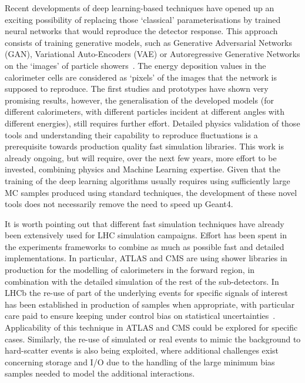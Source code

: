 Recent developments of deep
learning-based techniques have opened up an exciting possibility of
replacing those `classical' parameterisations by trained neural networks
that would reproduce the detector response. This approach consists of
training generative models, such as Generative Adversarial Networks
(GAN), Variational Auto-Encoders (VAE) or Autoregressive Generative
Networks on the `images' of particle 
showers~\cite{ML001-GAN, aishik_ghosh_2019_3599705, GAN-ATLAS}. The energy
deposition values in the calorimeter cells are considered as `pixels' of
the images that the network is supposed to reproduce. The first studies
and prototypes have shown very promising results, however, the
generalisation of the developed models (for different calorimeters, with
different particles incident at different angles with different
energies), still requires further effort. Detailed physics validation of
those tools and understanding their capability to reproduce
fluctuations is a prerequisite towards production quality fast
simulation libraries. This work is already ongoing, but will require,
over the next few years, more effort to be invested, combining
physics and Machine Learning expertise. Given that the training of the
deep learning algorithms usually requires using sufficiently large MC
samples produced using standard techniques, the development of these novel
tools does not necessarily remove the need to speed up Geant4.

It is worth pointing out that different fast simulation techniques have
already been extensively used for LHC simulation campaigns. Effort has
been spent in the experiments frameworks to combine as much as possible
fast and detailed implementations. In particular, ATLAS and CMS are using
shower libraries in production for the modelling of
calorimeters in the forward region, in combination with the detailed
simulation of the rest of the sub-detectors. In LHCb the re-use of part
of the underlying events for specific signals of interest has been
established in production of samples when appropriate, with particular
care paid to ensure keeping under control bias on statistical
uncertainties~\cite{LHCb02}. Applicability of this technique in ATLAS and CMS could be
explored for specific cases. Similarly, the re-use of simulated or real
events to mimic the background to hard-scatter events is also being exploited,
where additional challenges exist concerning storage and I/O due to the
handling of the large minimum bias samples needed to model the
additional interactions.

